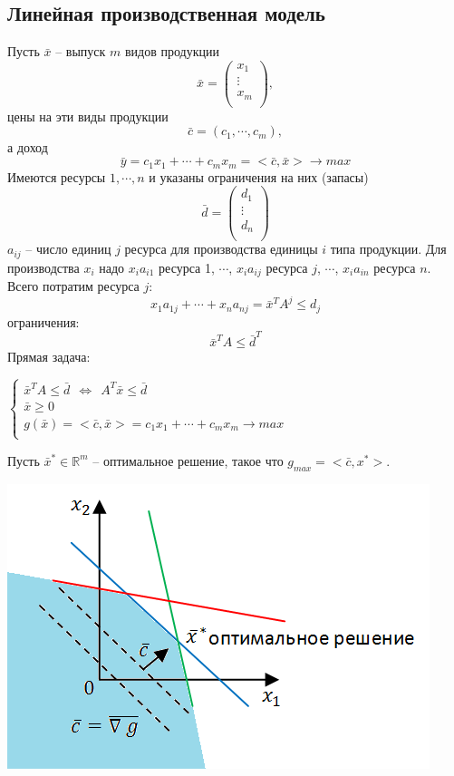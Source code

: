 \documentclass[12pt]{article}
\begin{document}
	\subsection{Линейная производственная модель}
	Пусть $\bar x$ -- выпуск $m$ видов продукции
	\[\bar x=\begin{pmatrix}
	x_1\\
	\vdots\\
	x_m\\
	\end{pmatrix},\]
	цены на эти виды продукции $$\bar c =(c_1, \cdots, c_m),$$
	а доход $$\bar y=c_1x_1+\cdots +c_mx_m=<\bar c, \bar x> \to max$$
	Имеются ресурсы $1, \cdots, n$ и указаны ограничения на них (запасы)
	\[\bar d=\begin{pmatrix}
	d_1\\
	\vdots\\
	d_n\\
	\end{pmatrix}\]
	$a_{ij}$ -- число единиц $j$ ресурса для производства единицы $i$ типа продукции. Для производства $x_i$ надо $x_ia_{i1}$ ресурса 1, $\cdots$, $x_ia_{ij}$ ресурса $j$, $\cdots$, $x_ia_{in}$ ресурса $n$.\\
	Всего потратим ресурса $j$: $$x_1a_{1j}+\cdots+x_na_{nj}=\bar x^T A^j \leqslant d_j$$
	ограничения: $$\bar x^TA\leqslant\bar d^T$$
	Прямая задача:
	\begin{center}
		$
		\left\{
		\begin{array}{lcl}
		\bar x^TA\leqslant \bar d ~~\Leftrightarrow ~~A^T\bar x\leqslant \bar d\\
		\bar x \geqslant 0\\
		g(\bar x)=<\bar c, \bar x>=c_1x_1+\cdots+c_mx_m \to max\\
		\end{array}
		\right.
		$
	\end{center}
	Пусть $\bar x^*\in \mathbb{R}^m$ -- оптимальное решение, такое что $g_{max}=<\bar c, x^*>$.\\
	\begin{center}
		\includegraphics[scale=0.84]{l18_3.png}\\
	\end{center}
\end{document}
